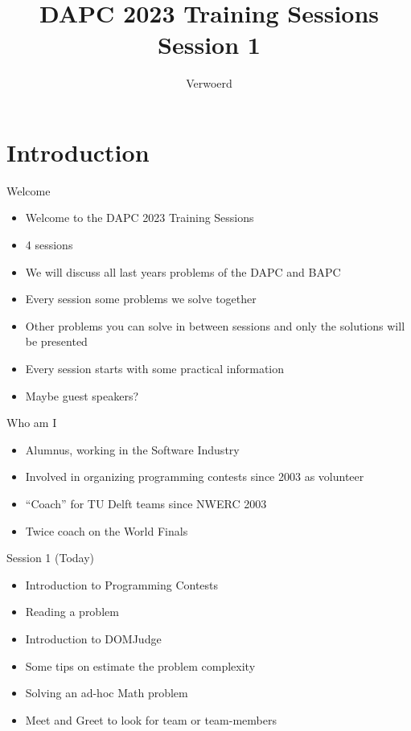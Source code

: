 \documentclass[11pt,pdf, aspectratio=169]{beamer}
\title{DAPC 2023 Training Sessions\\Session 1}
\author{Verwoerd}
\begin{document}
  \maketitle
  \section{Introduction}
  \begin{frame}{Welcome}
    \begin{itemize}
      \item Welcome to the DAPC 2023 Training Sessions
      \item 4 sessions
      \item We will discuss all last years problems of the DAPC and BAPC
      \item Every session some problems we solve together
      \item Other problems you can solve in between sessions and only the solutions will be presented
      \item Every session starts with some practical information
      \item Maybe guest speakers?
    \end{itemize}
  \end{frame}
  \begin{frame}{Who am I}
    \begin{itemize}
      \item Alumnus, working in the Software Industry
      \item Involved in organizing programming contests since 2003 as volunteer
      \item ``Coach'' for TU Delft teams since NWERC 2003
      \item Twice coach on the World Finals
    \end{itemize}
    \doclicenseThis
  \end{frame}
  \begin{frame}{Session 1 (Today)}
    \begin{itemize}
      \item Introduction to Programming Contests
      \item Reading a problem
      \item Introduction to DOMJudge
      \item Some tips on estimate the problem complexity
      \item Solving an ad-hoc Math problem
      \item Meet and Greet to look for team or team-members
    \end{itemize}
  \end{frame}
\end{document}
